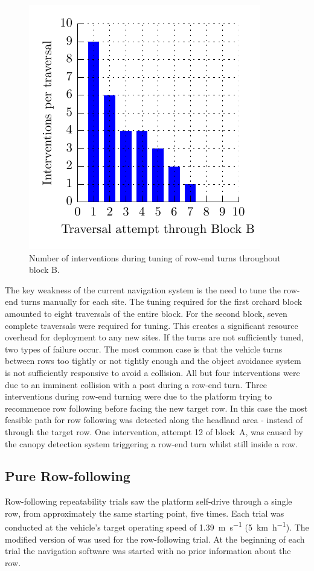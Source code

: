 \documentclass[preprint,authoryear,12pt]{elsarticle}
\begin{document}
    \begin{figure}[htb]
        \centering
        \includegraphics{imgs/tuning_graphs/newnham.pdf}
        \caption{
            Number of interventions during tuning of row-end turns throughout block B.
        }
        \label{fig:block_traversal_newnham}
    \end{figure}

    The key weakness of the current navigation system is the need to tune the row-end turns manually for each site.
    The tuning required for the first orchard block amounted to eight traversals of the entire block.
    For the second block, seven complete traversals were required for tuning.
    This creates a significant resource overhead for deployment to any new sites.
    If the turns are not sufficiently tuned, two types of failure occur.
    The most common case is that the vehicle turns between rows too tightly or not tightly enough and the object avoidance system is not sufficiently responsive to avoid a collision.
    All but four interventions were due to an imminent collision with a post during a row-end turn.
    Three interventions during row-end turning were due to the platform trying to recommence row following before facing the new target row.
    In this case the most feasible path for row following was detected along the headland area - instead of through the target row.
    One intervention, attempt 12 of block~A, was caused by the canopy detection system triggering a row-end turn whilst still inside a row.

  \subsection{Pure Row-following}
    Row-following repeatability trials saw the platform self-drive through a single row, from approximately the same starting point, five times.
    Each trial was conducted at the vehicle's target operating speed of \SI{1.39}{\meter\per\second} (\SI{5}{\kilo\meter\per\hour}).
    The modified version of \cite{Bell2016} was used for the row-following trial.
    At the beginning of each trial the navigation software was started with no prior information about the row.
\end{document}
